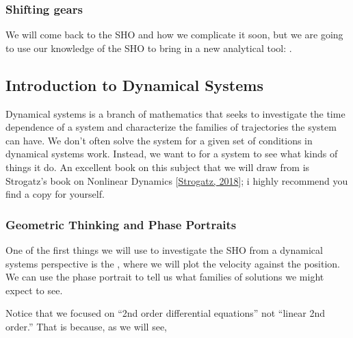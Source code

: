 \documentclass[letterpaper,10pt,english]{jupyterBook}
\begin{document}
\subsubsection{Shifting gears}
\label{\detokenize{content/2_oscillations/activity-SHO_and_dynamical_systems:shifting-gears}}
\sphinxAtStartPar
We will come back to the SHO and how we complicate it soon, but we are going to use our knowledge of the SHO to bring in a new analytical tool: .


\subsection{Introduction to Dynamical Systems}
\label{\detokenize{content/2_oscillations/activity-SHO_and_dynamical_systems:introduction-to-dynamical-systems}}
\sphinxAtStartPar
Dynamical systems is a branch of mathematics that seeks to investigate the time dependence of a system and characterize the families of trajectories the system can have. We don’t often solve the system for a given set of conditions in dynamical systems work. Instead, we want to  for a system to see what kinds of things it  do. An excellent book on this subject that we will draw from is Strogatz’s book on Nonlinear Dynamics {[}\hyperlink{cite.content/X_additional_pages/references-page:id6}{Strogatz, 2018}{]}; i highly recommend you find a copy for yourself.


\subsubsection{Geometric Thinking and Phase Portraits}
\label{\detokenize{content/2_oscillations/activity-SHO_and_dynamical_systems:geometric-thinking-and-phase-portraits}}
\sphinxAtStartPar
One of the first things we will use to investigate the SHO from a dynamical systems perspective is the , where we will plot the velocity against the position. We can use the phase portrait to tell us what families of solutions we might expect to see.

\sphinxAtStartPar
{} Notice that we focused on “2nd order differential equations” not “linear 2nd order.” That is because, as we will see, 
\end{document}
